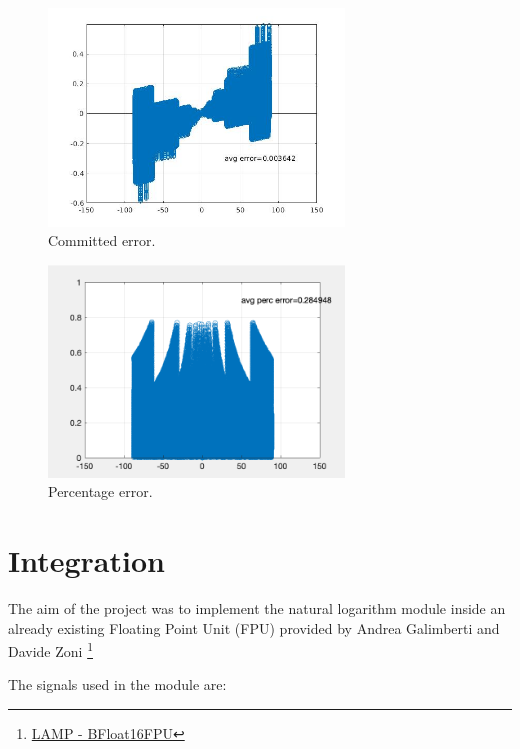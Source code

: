 \documentclass{report}
\begin{document}
\begin{figure}[ht]
  \centering
    \includegraphics[width=0.7\textwidth]{images/avg_err.jpg}
    \caption{Committed error.}
\end{figure}

\begin{figure}[]
  \centering
    \includegraphics[width=0.7\textwidth]{images/avg_perc_err.png}
    \caption{Percentage error.}
\end{figure}
\chapter{Integration}
The aim of the project was to implement the natural logarithm module inside an already existing Floating Point Unit (FPU) provided by  Andrea Galimberti and Davide Zoni 
\footnote{\href{https://gitlab.com/davide.zoni/bfloat_fpu_systemverilog} {LAMP - BFloat16FPU} }

The signals used in the module are:
\end{document}
